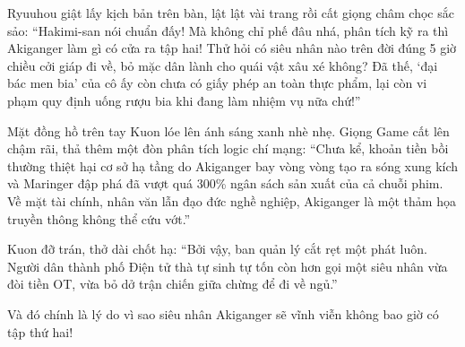 \documentclass[../main.tex]{subfiles}
\begin{document}
Ryuuhou giật lấy kịch bản trên bàn, lật lật vài trang rồi cất giọng châm chọc sắc sảo: ``Hakimi-san nói chuẩn đấy! Mà không chỉ phế đâu nhá, phân tích kỹ ra thì Akiganger làm gì có cửa ra tập hai! Thử hỏi có siêu nhân nào trên đời đúng 5 giờ chiều cởi giáp đi về, bỏ mặc dân lành cho quái vật xâu xé không? Đã thế, `đại bác men bia' của cô ấy còn chưa có giấy phép an toàn thực phẩm, lại còn vi phạm quy định uống rượu bia khi đang làm nhiệm vụ nữa chứ!''

Mặt đồng hồ trên tay Kuon lóe lên ánh sáng xanh nhè nhẹ. Giọng Game cất lên chậm rãi, thả thêm một đòn phân tích logic chí mạng: ``Chưa kể, khoản tiền bồi thường thiệt hại cơ sở hạ tầng do Akiganger bay vòng vòng tạo ra sóng xung kích và Maringer đập phá đã vượt quá 300\% ngân sách sản xuất của cả chuỗi phim. Về mặt tài chính, nhân văn lẫn đạo đức nghề nghiệp, Akiganger là một thảm họa truyền thông không thể cứu vớt.''

Kuon đỡ trán, thở dài chốt hạ: ``Bởi vậy, ban quản lý cắt rẹt một phát luôn. Người dân thành phố Điện tử thà tự sinh tự tốn còn hơn gọi một siêu nhân vừa đòi tiền OT, vừa bỏ dở trận chiến giữa chừng để đi về ngủ.''

Và đó chính là lý do vì sao siêu nhân Akiganger sẽ vĩnh viễn không bao giờ có tập thứ hai!
\end{document}

